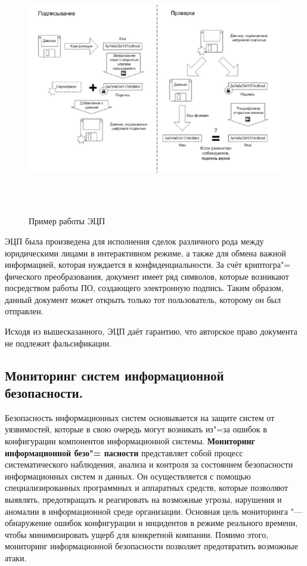     \begin{figure}[H]
        \centering
        \includegraphics[height = 11cm, width = 14cm]{img/legit_doc.png}
        \caption{Пример работы ЭЦП}
    \end{figure}

    ЭЦП была произведена для исполнения сделок различного рода между юридическими лицами в интерактивном режиме,
    а также для обмена важной информацией, которая нуждается в конфиденциальности. За счёт криптогра"=
    фического преобразования,
    документ имеет ряд символов, которые возникают посредством работы ПО, создающего электронную подпись. Таким образом, данный документ
    может открыть только тот пользователь, которому он был отправлен.

    Исходя из вышесказанного, ЭЦП даёт гарантию, что авторское право документа не подлежит фальсификации.\cite{crypto}

\newpage
\subsection{Мониторинг систем информационной безопасности.}
    Безопасность информационных систем основывается на защите систем от уязвимостей, которые в свою очередь могут возникать из"=за
    ошибок в конфигурации компонентов информационной системы. \textbf{Мониторинг информационной безо"=
    пасности} представляет собой процесс систематического 
    наблюдения, анализа и контроля за состоянием безопасности информационных систем и данных. Он осуществляется с помощью специализированных программных и 
    аппаратных средств, которые позволяют выявлять, предотвращать и реагировать на возможные угрозы, нарушения и аномалии в информационной среде организации.
    Основная цель мониторинга "--- обнаружение ошибок конфигурации и инцидентов в режиме реального времени, чтобы минимизировать ущерб для конкретной компании.
    Помимо этого, мониторинг информационной безопасности позволяет предотвратить возможные атаки.

